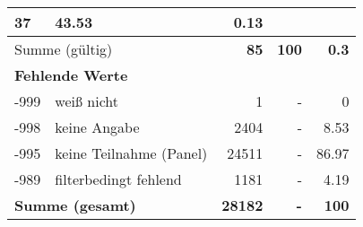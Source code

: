 \begin{longtable}{lXrrr}
       \num{37} &
       \num[round-mode=places,round-precision=2]{43.53} &
         \num[round-mode=places,round-precision=2]{0.13} \\
     \midrule
     \multicolumn{2}{l}{Summe (gültig)} &
       \textbf{\num{85}} &
     \textbf{100} &
       \textbf{\num[round-mode=places,round-precision=2]{0.3}} \\
     \multicolumn{5}{l}{\textbf{Fehlende Werte}}\\
       -999 &
       weiß nicht &
         \num{1} &
        - &
         \num[round-mode=places,round-precision=2]{0} \\
       -998 &
       keine Angabe &
         \num{2404} &
        - &
         \num[round-mode=places,round-precision=2]{8.53} \\
       -995 &
       keine Teilnahme (Panel) &
         \num{24511} &
        - &
         \num[round-mode=places,round-precision=2]{86.97} \\
       -989 &
       filterbedingt fehlend &
         \num{1181} &
        - &
         \num[round-mode=places,round-precision=2]{4.19} \\
     \midrule
     \multicolumn{2}{l}{\textbf{Summe (gesamt)}} &
          \textbf{\num{28182}} &
        \textbf{-} &
        \textbf{100} \\
     \bottomrule
     \end{longtable}
     
